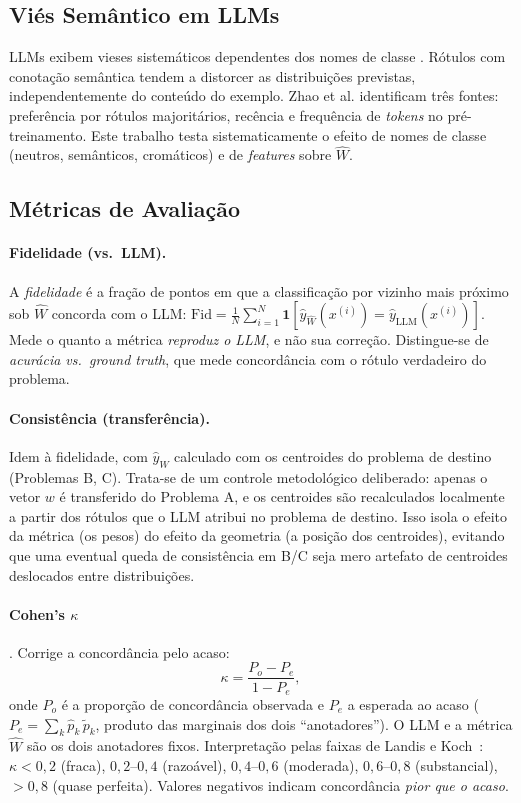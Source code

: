 \documentclass[12pt,a4paper]{article}
\newcommand{\West}{\ensuremath{\hat{W}}}   %
\begin{document}
\subsection{Viés Semântico em LLMs}

LLMs exibem vieses sistemáticos dependentes dos nomes de classe
\cite{zhaoCalibrateBefore2021}. Rótulos com conotação semântica tendem a distorcer as
distribuições previstas, independentemente do conteúdo do exemplo. Zhao et al. identificam
três fontes: preferência por rótulos majoritários, recência e frequência de \emph{tokens}
no pré-treinamento. Este trabalho testa sistematicamente o efeito de nomes de classe
(neutros, semânticos, cromáticos) e de \emph{features} sobre \West{}.

\subsection{Métricas de Avaliação}
\label{sec:metricas}

\paragraph{Fidelidade (vs.\ LLM).}
A \emph{fidelidade} é a fração de pontos em que a classificação por vizinho mais próximo sob
\West{} concorda com o LLM: $\text{Fid} = \frac{1}{N}\sum_{i=1}^N
\mathbf{1}[\hat{y}_{\West}(x^{(i)}) = \hat{y}_{\text{LLM}}(x^{(i)})]$. Mede o quanto a
métrica \emph{reproduz o LLM}, e não sua correção. Distingue-se de \emph{acurácia vs.\
ground truth}, que mede concordância com o rótulo verdadeiro do problema.

\paragraph{Consistência (transferência).}
Idem à fidelidade, com $\hat{y}_{\West}$ calculado com os centroides do problema de destino
(Problemas B, C). Trata-se de um controle metodológico deliberado: apenas o vetor $w$ é
transferido do Problema A, e os centroides são recalculados localmente a partir dos rótulos
que o LLM atribui no problema de destino. Isso isola o efeito da métrica (os pesos) do
efeito da geometria (a posição dos centroides), evitando que uma eventual queda de
consistência em B/C seja mero artefato de centroides deslocados entre distribuições.

\paragraph{Cohen's $\kappa$} \cite{artsteinInterCoder2008}. Corrige a concordância pelo
acaso:
\begin{equation}
  \kappa = \frac{P_o - P_e}{1 - P_e},
\end{equation}
onde $P_o$ é a proporção de concordância observada e $P_e$ a esperada ao acaso
($P_e = \sum_k \hat{p}_k\,\tilde{p}_k$, produto das marginais dos dois ``anotadores''). O
LLM e a métrica \West{} são os dois anotadores fixos. Interpretação pelas faixas de Landis e
Koch~\cite{landisKoch1977}: $\kappa<0{,}2$ (fraca),
$0{,}2$–$0{,}4$ (razoável), $0{,}4$–$0{,}6$ (moderada), $0{,}6$–$0{,}8$ (substancial),
$>0{,}8$ (quase perfeita). Valores negativos indicam concordância \emph{pior que o acaso}.
\end{document}
